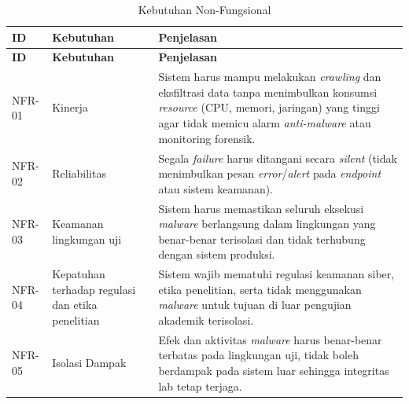 \begin{longtable}{|p{1.5cm}|p{5cm}|p{7cm}|}
\caption{Kebutuhan Non-Fungsional}
\label{tbl:kebutuhan-nonfungsional} \\
\hline
\textbf{ID} & \textbf{Kebutuhan} & \textbf{Penjelasan} \\
\hline
\endfirsthead

\hline
\textbf{ID} & \textbf{Kebutuhan} & \textbf{Penjelasan} \\
\hline
\endhead

\hline
\endfoot

NFR-01 & Kinerja &
Sistem harus mampu melakukan \textit{crawling} dan eksfiltrasi data tanpa menimbulkan konsumsi
\textit{resource} (CPU, memori, jaringan) yang tinggi agar tidak memicu alarm \textit{anti-malware}
atau monitoring forensik. \\
\hline

NFR-02 & Reliabilitas &
Segala \textit{failure} harus ditangani secara \textit{silent} (tidak menimbulkan pesan
\textit{error}/\textit{alert} pada \textit{endpoint} atau sistem keamanan). \\
\hline

NFR-03 & Keamanan lingkungan uji &
Sistem harus memastikan seluruh eksekusi \textit{malware} berlangsung dalam lingkungan yang benar-benar terisolasi dan tidak terhubung dengan sistem produksi. \\
\hline

NFR-04 & Kepatuhan terhadap regulasi dan etika penelitian &
Sistem wajib mematuhi regulasi keamanan siber, etika penelitian, serta tidak menggunakan
\textit{malware} untuk tujuan di luar pengujian akademik terisolasi. \\
\hline

NFR-05 & Isolasi Dampak &
Efek dan aktivitas \textit{malware} harus benar-benar terbatas pada lingkungan uji,
tidak boleh berdampak pada sistem luar sehingga integritas lab tetap terjaga. \\
\hline

\end{longtable}